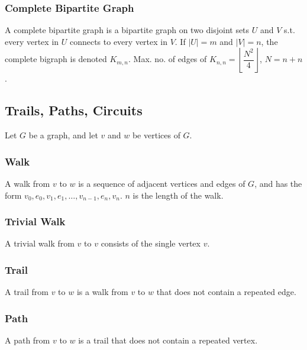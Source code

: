 \documentclass{article}
\theoremstyle{plain}
\theoremstyle{definition}
\theoremstyle{remark}
\begin{document}
\subsubsection*{Complete Bipartite Graph}
A complete bipartite graph is a bipartite graph on two disjoint sets $U$ and $V$ s.t. every vertex in $U$ connects to every vertex in $V$. If $|U|=m$ and $|V|=n$, the complete bigraph is denoted $K_{m,n}$. Max. no. of edges of $K_{n,n} = \left\lfloor \dfrac{N^2}{4} \right\rfloor$, $N = n+n$.
 
\begin{center}
\end{center}
 
\subsection{Trails, Paths, Circuits}
Let $G$ be a graph, and let $v$ and $w$ be vertices of $G$.
 
\subsubsection*{Walk}
A walk from $v$ to $w$ is a sequence of adjacent vertices and edges of $G$, and has the form $v_0, e_0, v_1, e_1, \dots, v_{n-1}, e_n, v_n$. $n$ is the length of the walk.
 
\subsubsection*{Trivial Walk}
A trivial walk from $v$ to $v$ consists of the single vertex $v$.
 
\subsubsection*{Trail}
A trail from $v$ to $w$ is a walk from $v$ to $w$ that does not contain a repeated edge.
 
\subsubsection*{Path}
A path from $v$ to $w$ is a trail that does not contain a repeated vertex.
 
\end{document}
